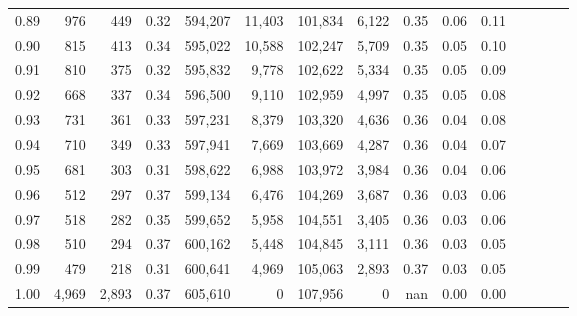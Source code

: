 \begin{tabular}{rrrcrrrrrrrrrrr}
0.89 &     976 &    449 &                                       0.32 &  594,207 &   11,403 &  101,834 &    6,122 &  0.35 &  0.06 &                         0.11 \\
0.90 &     815 &    413 &                                       0.34 &  595,022 &   10,588 &  102,247 &    5,709 &  0.35 &  0.05 &                         0.10 \\
0.91 &     810 &    375 &                                       0.32 &  595,832 &    9,778 &  102,622 &    5,334 &  0.35 &  0.05 &                         0.09 \\
0.92 &     668 &    337 &                                       0.34 &  596,500 &    9,110 &  102,959 &    4,997 &  0.35 &  0.05 &                         0.08 \\
0.93 &     731 &    361 &                                       0.33 &  597,231 &    8,379 &  103,320 &    4,636 &  0.36 &  0.04 &                         0.08 \\
0.94 &     710 &    349 &                                       0.33 &  597,941 &    7,669 &  103,669 &    4,287 &  0.36 &  0.04 &                         0.07 \\
0.95 &     681 &    303 &                                       0.31 &  598,622 &    6,988 &  103,972 &    3,984 &  0.36 &  0.04 &                         0.06 \\
0.96 &     512 &    297 &                                       0.37 &  599,134 &    6,476 &  104,269 &    3,687 &  0.36 &  0.03 &                         0.06 \\
0.97 &     518 &    282 &                                       0.35 &  599,652 &    5,958 &  104,551 &    3,405 &  0.36 &  0.03 &                         0.06 \\
0.98 &     510 &    294 &                                       0.37 &  600,162 &    5,448 &  104,845 &    3,111 &  0.36 &  0.03 &                         0.05 \\
0.99 &     479 &    218 &                                       0.31 &  600,641 &    4,969 &  105,063 &    2,893 &  0.37 &  0.03 &                         0.05 \\
1.00 &   4,969 &  2,893 &                                       0.37 &  605,610 &        0 &  107,956 &        0 &   nan &  0.00 &                         0.00 \\
\bottomrule
\end{tabular}
